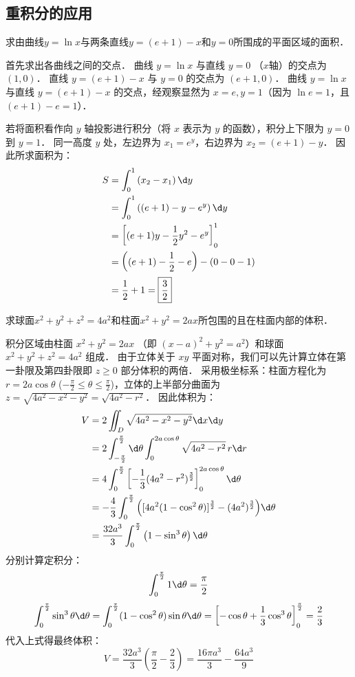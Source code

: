 \documentclass[12pt, a4paper, oneside, UTF8]{ctexbook}
\begin{document}
\subsection{重积分的应用}
\begin{exercise}
    求由曲线$y=\ln x$与两条直线$y=(e+1)-x$和$y=0$所围成的平面区域的面积．
\end{exercise}
\begin{solution}
首先求出各曲线之间的交点．
曲线 $y=\ln x$ 与直线 $y=0$ （$x$轴）的交点为 $(1, 0)$．
直线 $y=(e+1)-x$ 与 $y=0$ 的交点为 $(e+1, 0)$．
曲线 $y=\ln x$ 与直线 $y=(e+1)-x$ 的交点，经观察显然为 $x=e, y=1$（因为 $\ln e = 1$，且 $(e+1)-e = 1$）．

若将面积看作向 $y$ 轴投影进行积分（将 $x$ 表示为 $y$ 的函数），积分上下限为 $y=0$ 到 $y=1$．
同一高度 $y$ 处，左边界为 $x_1 = e^y$，右边界为 $x_2 = (e+1)-y$．
因此所求面积为：
\begin{align*}
S &= \int_0^1 \left( x_2 - x_1 \right) \d y \\
  &= \int_0^1 \left( (e+1)-y - e^y \right) \d y \\
  &= \left[ (e+1)y - \frac{1}{2}y^2 - e^y \right]_0^1 \\
  &= \left( (e+1) - \frac{1}{2} - e \right) - \left( 0 - 0 - 1 \right) \\
  &= \frac{1}{2} + 1 = \boxed{\frac{3}{2}}
\end{align*}
\end{solution}
\begin{exercise}
    求球面$x^2+y^2+z^2=4a^2$和柱面$x^2+y^2=2ax$所包围的且在柱面内部的体积．
\end{exercise}
\begin{solution}
积分区域由柱面 $x^2+y^2=2ax$ （即 $(x-a)^2+y^2=a^2$）和球面 $x^2+y^2+z^2=4a^2$ 组成．
由于立体关于 $xy$ 平面对称，我们可以先计算立体在第一卦限及第四卦限即 $z \ge 0$ 部分体积的两倍．
采用极坐标系：柱面方程化为 $r=2a\cos\theta$ ($-\frac{\pi}{2} \le \theta \le \frac{\pi}{2}$)，立体的上半部分曲面为 $z=\sqrt{4a^2-x^2-y^2} = \sqrt{4a^2-r^2}$．
因此体积为：
\begin{align*}
V &= 2 \iint_{D} \sqrt{4a^2-x^2-y^2} \d x \d y \\
  &= 2 \int_{-\frac{\pi}{2}}^{\frac{\pi}{2}} \d\theta \int_0^{2a\cos\theta} \sqrt{4a^2-r^2} \, r \d r \\
  &= 4 \int_0^{\frac{\pi}{2}} \left[ -\frac{1}{3}(4a^2-r^2)^{\frac{3}{2}} \right]_0^{2a\cos\theta} \d\theta \\
  &= -\frac{4}{3} \int_0^{\frac{\pi}{2}} \Big( [4a^2(1-\cos^2\theta)]^{\frac{3}{2}} - (4a^2)^{\frac{3}{2}} \Big) \d\theta \\
  &= \frac{32a^3}{3} \int_0^{\frac{\pi}{2}} \left( 1 - \sin^3\theta \right) \d\theta
\end{align*}
分别计算定积分：
\[ \int_0^{\frac{\pi}{2}} 1 \d\theta = \frac{\pi}{2} \]
\[ \int_0^{\frac{\pi}{2}} \sin^3\theta \d\theta = \int_0^{\frac{\pi}{2}} (1-\cos^2\theta)\sin\theta \d\theta = \left[ -\cos\theta + \frac{1}{3}\cos^3\theta \right]_0^{\frac{\pi}{2}} = \frac{2}{3} \]
代入上式得最终体积：
\[ V = \frac{32a^3}{3} \left( \frac{\pi}{2} - \frac{2}{3} \right) = \boxed{\frac{16\pi a^3}{3} - \frac{64a^3}{9}} \]
\end{solution}
\end{document}

